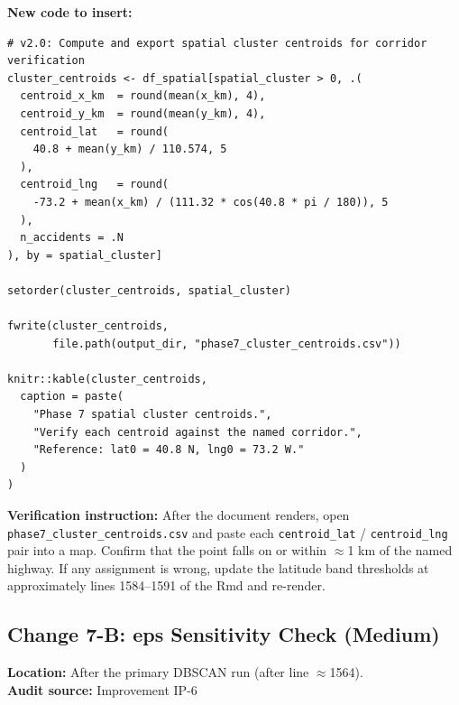 \documentclass[11pt]{article}
\newcommand{\rfile}[1]{\texttt{#1}}
\newcommand{\rcode}[1]{\texttt{#1}}
\begin{document}
\textbf{New code to insert:}
\begin{lstlisting}
# v2.0: Compute and export spatial cluster centroids for corridor verification
cluster_centroids <- df_spatial[spatial_cluster > 0, .(
  centroid_x_km  = round(mean(x_km), 4),
  centroid_y_km  = round(mean(y_km), 4),
  centroid_lat   = round(
    40.8 + mean(y_km) / 110.574, 5
  ),
  centroid_lng   = round(
    -73.2 + mean(x_km) / (111.32 * cos(40.8 * pi / 180)), 5
  ),
  n_accidents = .N
), by = spatial_cluster]

setorder(cluster_centroids, spatial_cluster)

fwrite(cluster_centroids,
       file.path(output_dir, "phase7_cluster_centroids.csv"))

knitr::kable(cluster_centroids,
  caption = paste(
    "Phase 7 spatial cluster centroids.",
    "Verify each centroid against the named corridor.",
    "Reference: lat0 = 40.8 N, lng0 = 73.2 W."
  )
)
\end{lstlisting}

\textbf{Verification instruction:} After the document renders, open
\rfile{phase7\_cluster\_centroids.csv} and paste each
\rcode{centroid\_lat} / \rcode{centroid\_lng} pair into a map. Confirm
that the point falls on or within $\approx$1 km of the named highway.
If any assignment is wrong, update the latitude band thresholds at
approximately lines 1584--1591 of the Rmd and re-render.

\subsection{Change 7-B: eps Sensitivity Check (Medium)}

\textbf{Location:} After the primary DBSCAN run (after line $\approx$1564).\\
\textbf{Audit source:} Improvement IP-6
\end{document}
